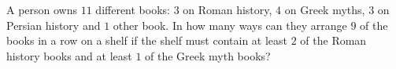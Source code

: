 A person owns $11$ different books: $3$ on Roman history, $4$ on Greek myths, $3$ on Persian history and $1$ other book. In how many ways can they arrange $9$ of the books in a row on a shelf if the shelf must contain at least $2$ of the Roman history books and at least $1$ of the Greek myth books?
